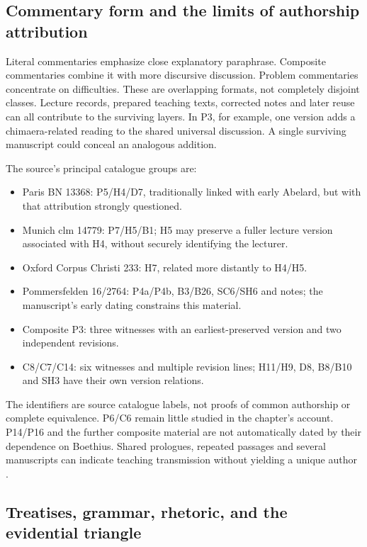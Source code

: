 \subsection{Commentary form and the limits of authorship attribution}

Literal commentaries emphasize close explanatory paraphrase.
Composite commentaries combine it with more discursive discussion.
Problem commentaries concentrate on difficulties.
These are overlapping formats, not completely disjoint classes.
Lecture records, prepared teaching texts, corrected notes and
later reuse can all contribute to the surviving layers.
In P3, for example, one version adds a chimaera-related reading
to the shared universal discussion. A single surviving manuscript
could conceal an analogous addition.

The source's principal catalogue groups are:

\begin{itemize}
\item Paris BN 13368: P5/H4/D7, traditionally linked with early Abelard,
  but with that attribution strongly questioned.
\item Munich clm 14779: P7/H5/B1; H5 may preserve a fuller lecture version
  associated with H4, without securely identifying the lecturer.
\item Oxford Corpus Christi 233: H7, related more distantly to H4/H5.
\item Pommersfelden 16/2764: P4a/P4b, B3/B26, SC6/SH6 and notes;
  the manuscript's early dating constrains this material.
\item Composite P3: three witnesses with an earliest-preserved version
  and two independent revisions.
\item C8/C7/C14: six witnesses and multiple revision lines;
  H11/H9, D8, B8/B10 and SH3 have their own version relations.
\end{itemize}

The identifiers are source catalogue labels, not proofs of common
authorship or complete equivalence. P6/C6 remain little studied
in the chapter's account. P14/P16 and the further composite
material are not automatically dated by their dependence on Boethius.
Shared prologues, repeated passages and several manuscripts can
indicate teaching transmission without yielding a unique author
\cite[pp.~66--70]{Marenbon2007FordhamTurnTwelfth}.

\subsection{Treatises, grammar, rhetoric, and the evidential triangle}

